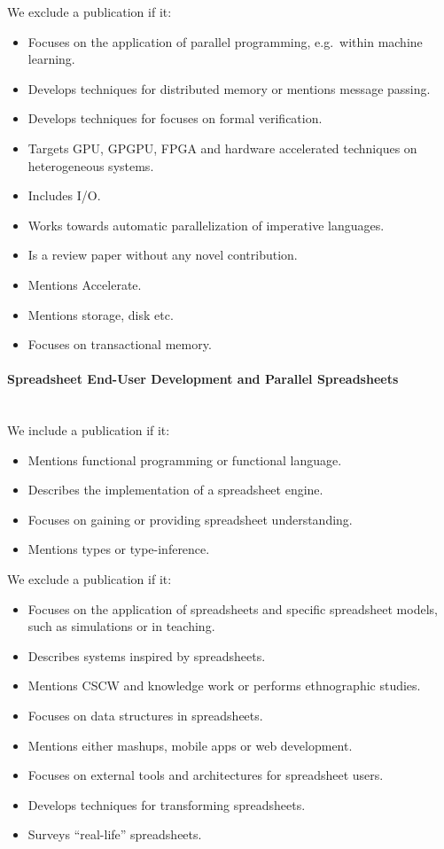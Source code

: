 \documentclass[a4paper]{article}
\begin{document}
We exclude a publication if it:

\begin{itemize}
\item Focuses on the application of parallel programming, e.g.\ within
  machine learning.
\item Develops techniques for distributed memory or mentions message
  passing.
\item Develops techniques for focuses on formal verification.
\item Targets GPU, GPGPU, FPGA and hardware accelerated techniques on
  heterogeneous systems.
\item Includes I/O.
\item Works towards automatic parallelization of imperative languages.
\item Is a review paper without any novel contribution.
\item Mentions Accelerate.
\item Mentions storage, disk etc.
\item Focuses on transactional memory.
\end{itemize}

\paragraph{Spreadsheet End-User Development and Parallel Spreadsheets}
~\\

We include a publication if it:

\begin{itemize}
\item Mentions functional programming or functional language.
\item Describes the implementation of a spreadsheet engine.
\item Focuses on gaining or providing spreadsheet understanding.
\item Mentions types or type-inference.
\end{itemize}

We exclude a publication if it:

\begin{itemize}
\item Focuses on the application of spreadsheets and specific
  spreadsheet models, such as simulations or in teaching.
\item Describes systems inspired by spreadsheets.
\item Mentions CSCW and knowledge work or performs ethnographic
  studies.
\item Focuses on data structures in spreadsheets.
\item Mentions either mashups, mobile apps or web development.
\item Focuses on external tools and architectures for spreadsheet
  users.
\item Develops techniques for transforming spreadsheets.
\item Surveys ``real-life'' spreadsheets.
\end{itemize}
\end{document}
